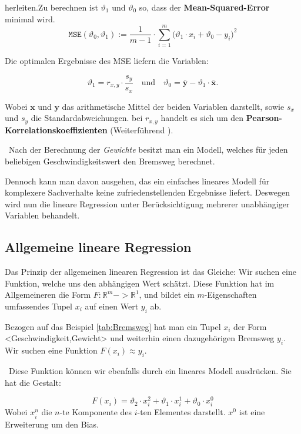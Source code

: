 herleiten.Zu berechnen ist $\vartheta_1$ und $\vartheta_0$ so, dass der \textbf{Mean-Squared-Error} minimal wird. 
\begin{equation}
\label{eq:mse}
\mathtt{MSE}(\vartheta_0, \vartheta_1) := \frac{1}{m-1} \cdot \sum\limits_{i=1}^m \bigl(\vartheta_1 \cdot x_i + \vartheta_0 - y_i\bigr)^2
\end{equation}

Die optimalen Ergebnisse des MSE liefern die Variablen:

\begin{equation}
\label{eq:theta0}
\vartheta_1 = r_{x,y} \cdot \frac{s_y}{s_x} \quad \mbox{und} \quad \vartheta_0 = \bar{\mathbf{y}} - \vartheta_1 \cdot \bar{\mathbf{x}}.
\end{equation}

Wobei $\mathbf{x}$ und $\mathbf{y}$ das arithmetische Mittel der beiden Variablen darstellt, sowie $s_x$ und $s_y$ die Standardabweichungen. bei $r_{x,y}$ handelt es sich um den \textbf{Pearson-Korrelationskoeffizienten} (Weiterführend \cite{BPK}). 

~\newline Nach der Berechnung der \textit{Gewichte} besitzt man ein Modell, welches für jeden beliebigen Geschwindigkeitswert den Bremsweg berechnet. 

Dennoch kann man davon ausgehen, das ein einfaches lineares Modell für komplexere Sachverhalte keine zufriedenstellenden Ergebnisse liefert. Deswegen wird nun die lineare Regression unter Berücksichtigung mehrerer unabhängiger Variablen behandelt. 
\subsection{Allgemeine lineare Regression}
Das Prinzip der allgemeinen linearen Regression ist das Gleiche: Wir suchen eine Funktion, welche uns den abhängigen Wert schätzt. Diese Funktion hat im Allgemeineren die Form  $F:\mathbb{R}^m -> \mathbb{R}^1$, und bildet ein $m$-Eigenschaften umfassendes Tupel $x_i$ auf einen Wert $y_i$ ab. 

Bezogen auf das Beispiel \ref{tab:Bremsweg} hat man ein Tupel $x_i$ der Form <Geschwindigkeit,Gewicht> und weiterhin einen dazugehörigen Bremsweg $y_i$. Wir suchen eine Funktion $F(x_i) \approx y_i$. 

~\newline Diese Funktion können wir ebenfalls durch ein lineares Modell ausdrücken. Sie hat die Gestalt: 

\begin{equation}
	F(x_i)= \vartheta_2 \cdot x^2_i + \vartheta_1 \cdot x^1_i + \vartheta_0 \cdot x^0_i
\end{equation}
Wobei $x^n_i$ die $n$-te Komponente des $i$-ten Elementes darstellt. $x^0$ ist eine Erweiterung um den Bias.


